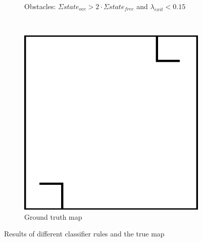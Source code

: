\begin{figure}[htbp]
\begin{subfigure}{.5\textwidth}
		\caption{Obstacles: \(\Sigma state_{occ} > 2 \cdot \Sigma state_{free}\) and \(\lambda_{exit} < 0.15\) }
		\label{fig:amcl_classifier:chosen}
	\end{subfigure}\\[1ex]
	\begin{subfigure}{1\textwidth}
		\centering
		\includegraphics[width=.5\linewidth]{chapters/cost_interpretation/figures/dynamic_area_web.png}
		\caption{Ground truth map}
		\label{fig:amcl_classifier:groundtruth}
	\end{subfigure}
	\caption{Results of different classifier rules and the true map}
    \label{fig:amcl_classifier}
\end{figure}
